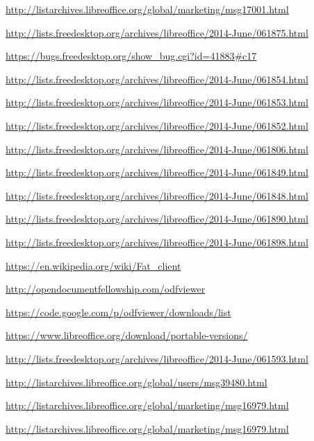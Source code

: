 \documentclass{article}
\begin{document}
\begin{thebibliography}{30}
    \url{http://listarchives.libreoffice.org/global/marketing/msg17001.html}

    \url{http://lists.freedesktop.org/archives/libreoffice/2014-June/061875.html}

    \url{https://bugs.freedesktop.org/show_bug.cgi?id=41883#c17}

    \url{http://lists.freedesktop.org/archives/libreoffice/2014-June/061854.html}

    \url{http://lists.freedesktop.org/archives/libreoffice/2014-June/061853.html}

    \url{http://lists.freedesktop.org/archives/libreoffice/2014-June/061852.html}

    \url{http://lists.freedesktop.org/archives/libreoffice/2014-June/061806.html}

    \url{http://lists.freedesktop.org/archives/libreoffice/2014-June/061849.html}

    \url{http://lists.freedesktop.org/archives/libreoffice/2014-June/061848.html}

    \url{http://lists.freedesktop.org/archives/libreoffice/2014-June/061890.html}

    \url{http://lists.freedesktop.org/archives/libreoffice/2014-June/061898.html}

    \url{https://en.wikipedia.org/wiki/Fat_client}

    \url{http://opendocumentfellowship.com/odfviewer}

    \url{https://code.google.com/p/odfviewer/downloads/list}

    \url{https://www.libreoffice.org/download/portable-versions/}

    \url{http://lists.freedesktop.org/archives/libreoffice/2014-June/061593.html}

    \url{http://listarchives.libreoffice.org/global/users/msg39480.html}

    \url{http://listarchives.libreoffice.org/global/marketing/msg16979.html}

    \url{http://listarchives.libreoffice.org/global/marketing/msg16979.html}


\end{thebibliography}
\end{document}
